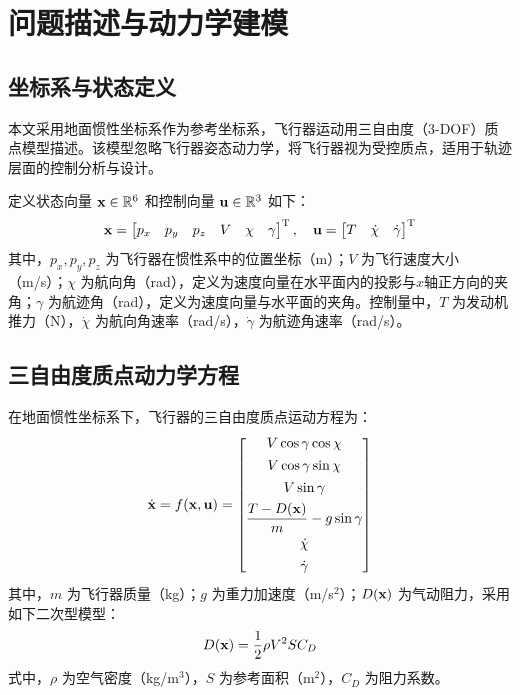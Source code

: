 \section{问题描述与动力学建模}\label{sec:model}

\subsection{坐标系与状态定义}

本文采用地面惯性坐标系作为参考坐标系，飞行器运动用三自由度（3-DOF）质点模型描述。该模型忽略飞行器姿态动力学，将飞行器视为受控质点，适用于轨迹层面的控制分析与设计。

定义状态向量 $\mathbf{x} \in \mathbb{R}^6$ 和控制向量 $\mathbf{u} \in \mathbb{R}^3$ 如下：
\begin{equation}\label{eq:state_control}
\mathbf{x} = \begin{bmatrix} p_x & p_y & p_z & V & \chi & \gamma \end{bmatrix}^{\mathrm{T}}, \quad
\mathbf{u} = \begin{bmatrix} T & \dot{\chi} & \dot{\gamma} \end{bmatrix}^{\mathrm{T}}
\end{equation}
其中，$p_x, p_y, p_z$ 为飞行器在惯性系中的位置坐标（m）；$V$ 为飞行速度大小（m/s）；$\chi$ 为航向角（rad），定义为速度向量在水平面内的投影与$x$轴正方向的夹角；$\gamma$ 为航迹角（rad），定义为速度向量与水平面的夹角。控制量中，$T$ 为发动机推力（N），$\dot{\chi}$ 为航向角速率（rad/s），$\dot{\gamma}$ 为航迹角速率（rad/s）。

\subsection{三自由度质点动力学方程}

在地面惯性坐标系下，飞行器的三自由度质点运动方程为：
\begin{equation}\label{eq:dynamics}
\dot{\mathbf{x}} = f(\mathbf{x}, \mathbf{u}) = 
\begin{bmatrix}
V \cos\gamma \cos\chi \\[4pt]
V \cos\gamma \sin\chi \\[4pt]
V \sin\gamma \\[4pt]
\dfrac{T - D(\mathbf{x})}{m} - g \sin\gamma \\[6pt]
\dot{\chi} \\[4pt]
\dot{\gamma}
\end{bmatrix}
\end{equation}
其中，$m$ 为飞行器质量（kg）；$g$ 为重力加速度（m/s$^2$）；$D(\mathbf{x})$ 为气动阻力，采用如下二次型模型：
\begin{equation}\label{eq:drag}
D(\mathbf{x}) = \frac{1}{2} \rho V^2 S C_D
\end{equation}
式中，$\rho$ 为空气密度（kg/m$^3$），$S$ 为参考面积（m$^2$），$C_D$ 为阻力系数。


